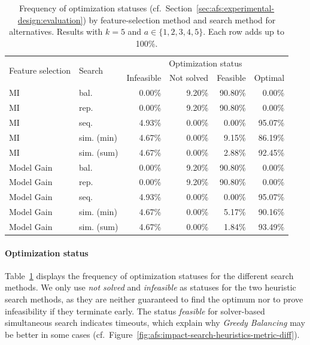 \documentclass{article}
\theoremstyle{definition}
\begin{document}
\begin{table}[t]
	\centering
	\begin{tabular}{llrrrr}
		\toprule
		\multirow{2}{*}{Feature selection} & \multirow{2}{*}{Search} & \multicolumn{4}{c}{Optimization status} \\
		\cmidrule(r){3-6}
		& & Infeasible & Not solved & Feasible & Optimal \\
		\midrule
		MI & bal. & 0.00\% & 9.20\% & 90.80\% & 0.00\% \\
		MI & rep. & 0.00\% & 9.20\% & 90.80\% & 0.00\% \\
		MI & seq. & 4.93\% & 0.00\% & 0.00\% & 95.07\% \\
		MI & sim. (min) & 4.67\% & 0.00\% & 9.15\% & 86.19\% \\
		MI & sim. (sum) & 4.67\% & 0.00\% & 2.88\% & 92.45\% \\
		Model Gain & bal. & 0.00\% & 9.20\% & 90.80\% & 0.00\% \\
		Model Gain & rep. & 0.00\% & 9.20\% & 90.80\% & 0.00\% \\
		Model Gain & seq. & 4.93\% & 0.00\% & 0.00\% & 95.07\% \\
		Model Gain & sim. (min) & 4.67\% & 0.00\% & 5.17\% & 90.16\% \\
		Model Gain & sim. (sum) & 4.67\% & 0.00\% & 1.84\% & 93.49\% \\
		\bottomrule
	\end{tabular}
	\caption{
		Frequency of optimization statuses (cf.~Section~\ref{sec:afs:experimental-design:evaluation}) by feature-selection method and search method for alternatives.
		Results with $k=5$ and $a \in \{1,2,3,4,5\}$.
		Each row adds up to 100\%.
	}
	\label{tab:afs:impact-search-heuristics-fs-method-optimization-status}
\end{table}

\paragraph{Optimization status}

Table~\ref{tab:afs:impact-search-heuristics-fs-method-optimization-status} displays the frequency of optimization statuses for the different search methods.
We only use \emph{not solved} and \emph{infeasible} as statuses for the two heuristic search methods, as they are neither guaranteed to find the optimum nor to prove infeasibility if they terminate early.
The status \emph{feasible} for solver-based simultaneous search indicates timeouts, which explain why \emph{Greedy Balancing} may be better in some cases (cf.~Figure~\ref{fig:afs:impact-search-heuristics-metric-diff}).
\end{document}
